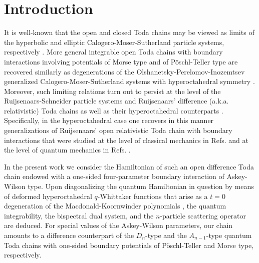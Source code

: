\documentclass[reqno]{amsart}
\theoremstyle{remark}
\numberwithin{equation}{section}
\begin{document}
\section{Introduction}\label{sec1}
It is well-known that the open and closed Toda chains may be viewed as limits of the hyperbolic and elliptic Calogero-Moser-Sutherland particle systems, respectively \cite{sut:introduction,rui:relativistic,ino:finite,rui:finite-dimensional}.
More general integrable open Toda chains
with boundary interactions involving potentials of Morse type \cite{kos:quantization,goo-wal:classical,skl:boundary}
and of P\"oschl-Teller type \cite{ino:finite,kuz-jor-chr:new}
are recovered similarly as degenerations of the Olshanetsky-Perelomov-Inozemtsev generalized Calogero-Moser-Sutherland systems with hyperoctahedral symmetry
\cite{ino:finite,osh:completely,shi:limit,ger-leb-obl:quantum}.
Moreover, such limiting relations turn out to persist at the level of the Ruijsenaars-Schneider particle systems and Ruijsenaars' difference (a.k.a. relativistic) Toda chains
\cite{rui:relativistic,rui:finite-dimensional,rui:systems,eti:whittaker,ger-leb-obl:q-deformed,hal-rui:kernel,bor-cor:macdonald} as well as their hyperoctahedral counterparts
\cite{die:difference,che:whittaker}.  Specifically, in the hyperoctahedral case one recovers in this manner generalizations of
Ruijsenaars' open relativistic Toda chain with boundary interactions that were studied at the level of classical mechanics in Refs.
\cite{sur:discrete,die:deformations,sur:problem} and at the level of quantum mechanics in Refs.
\cite{kuz-tsy:quantum,die:difference,eti:whittaker,sev:quantum,che:whittaker}.

In the present work we consider the Hamiltonian of such an open difference Toda chain
endowed with a one-sided four-parameter boundary interaction of Askey-Wilson type.
Upon diagonalizing the quantum Hamiltonian in question by means of deformed hyperoctahedral $q$-Whittaker functions that arise as a $t=0$ degeneration of the Macdonald-Koornwinder polynomials \cite{koo:askey-wilson,mac:affine}, the quantum integrability, the bispectral dual system, and the
$n$-particle scattering operator are deduced. For special values of the Askey-Wilson parameters, our chain amounts to a difference counterpart of the $D_n$-type and the $A_{n-1}$-type quantum Toda chains with one-sided boundary potentials of  P\"oschl-Teller and Morse type, respectively.
\end{document}
